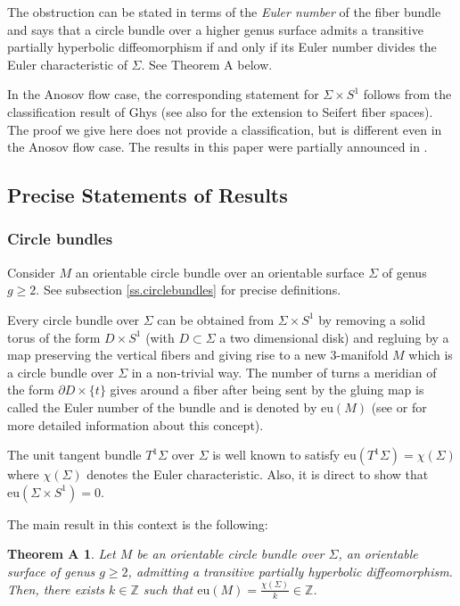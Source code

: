\documentclass[11pt]{amsart} %
\numberwithin{equation}{section}
\newtheorem*{teoA}{Theorem A}
\theoremstyle{remark}
\begin{document}
%
%
%
%
%
The obstruction can be stated in terms of the \emph{Euler number} of the fiber bundle and says that a circle bundle over a higher genus surface admits a transitive partially hyperbolic diffeomorphism if and only if its Euler number divides the Euler characteristic of $\Sigma$. See Theorem A below. 

In the Anosov flow case, the corresponding statement for $\Sigma \times S^1$ follows from the classification result of Ghys \cite{Ghys} (see also \cite{Barbot} for the extension to Seifert fiber spaces). The proof we give here does not provide a classification, but is different even in the Anosov flow case. The results in this paper were partially announced in \cite{HP-Survey}. 

\subsection{Precise Statements of Results} 

\subsubsection{Circle bundles} Consider $M$ an orientable circle bundle over an orientable surface $\Sigma$ of genus $g\geq 2$.  See subsection \ref{ss.circlebundles} for precise definitions. 

Every circle bundle over $\Sigma$ can be obtained from $\Sigma \times S^1$ by removing a solid torus of the form $D \times S^1$ (with $D \subset \Sigma$ a two dimensional disk) and regluing by a map preserving the vertical fibers and giving rise to a new 3-manifold $M$ which is a circle bundle over $\Sigma$ in a non-trivial way. The number of turns a meridian of the form $\partial D \times \{t\}$ gives around a fiber after being sent by the gluing map is called the Euler number of the bundle and is denoted by $\mathrm{eu}(M)$ (see \cite[Chapter 4 of Book II]{CandelConlon} or \cite{Hatcher} for more detailed information about this concept). 

The unit tangent bundle $T^1 \Sigma$ over $\Sigma$ is well known to satisfy $\mathrm{eu}(T^1\Sigma) = \chi (\Sigma)$ where $\chi(\Sigma)$ denotes the Euler characteristic. Also, it is direct to show that $\mathrm{eu}(\Sigma \times S^1)=0$. 

The main result in this context is the following: 

\begin{teoA}
Let $M$ be an orientable circle bundle over $\Sigma$, an orientable surface of genus $g\geq 2$, admitting a transitive partially hyperbolic diffeomorphism. Then, there exists $k\in \mathbb{Z}$ such that $\mathrm{eu}(M) = \frac{\chi(\Sigma)}{k} \in \mathbb{Z}$. 
\end{teoA}
\end{document}
